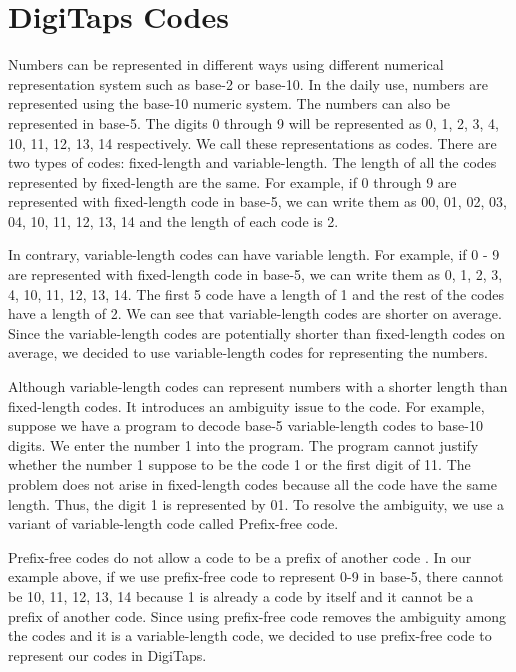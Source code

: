 \section{DigiTaps Codes}
\label{sec:codes}

Numbers can be represented in different ways using different numerical representation system such as base-2 or base-10. In the daily use, numbers are represented using the base-10 numeric system. The numbers can also be represented in base-5. The digits 0 through 9 will be represented as 0, 1, 2, 3, 4, 10, 11, 12, 13, 14 respectively. We call these representations as codes. There are two types of codes: fixed-length and variable-length. The length of all the codes represented by fixed-length are the same. For example, if 0 through 9 are represented with fixed-length code in base-5, we can write them as 00, 01, 02, 03, 04, 10, 11, 12, 13, 14 and the length of each code is 2.
\par
In contrary, variable-length codes can have variable length. For example, if 0 - 9 are represented with fixed-length code in base-5, we can write them as 0, 1, 2, 3, 4, 10, 11, 12, 13, 14. The first 5 code have a length of 1 and the rest of the codes have a length of 2. We can see that variable-length codes are shorter on average. Since the variable-length codes are potentially shorter than fixed-length codes on average, we decided to use variable-length codes for representing the numbers.
\par
Although variable-length codes can represent numbers with a shorter length than fixed-length codes. It introduces an ambiguity issue to the code. For example, suppose we have a program to decode base-5 variable-length codes to base-10 digits. We enter the number 1 into the program. The program cannot justify whether the number 1 suppose to be the code 1 or the first digit of 11. The problem does not arise in fixed-length codes because all the code have the same length. Thus, the digit 1 is represented by 01. To resolve the ambiguity, we use a variant of variable-length code called Prefix-free code. 
\par
Prefix-free codes do not allow a code to be a prefix of another code \cite{huf52}. In our example above, if we use prefix-free code to represent 0-9 in base-5, there cannot be 10, 11, 12, 13, 14 because 1 is already a code by itself and it cannot be a prefix of another code. Since using prefix-free code removes the ambiguity among the codes and it is a variable-length code, we decided to use prefix-free code to represent our codes in DigiTaps.

